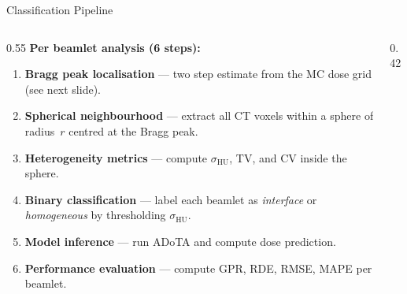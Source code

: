 \documentclass[aspectratio=169, 10pt]{beamer}
\begin{document}
\begin{frame}{Classification Pipeline}
  \begin{columns}[T]
    \begin{column}{0.55\textwidth}
      \textbf{Per beamlet analysis (6 steps):}
      \begin{enumerate}
        \item \textbf{Bragg peak localisation} — two step estimate
              from the MC dose grid (see next slide).
        \item \textbf{Spherical neighbourhood} — extract all CT voxels
              within a sphere of radius~$r$ centred at the Bragg peak.
        \item \textbf{Heterogeneity metrics} — compute $\sigma_{\text{HU}}$,
              TV, and CV inside the sphere.
        \item \textbf{Binary classification} — label each beamlet as
              \emph{interface} or \emph{homogeneous} by thresholding
              $\sigma_{\text{HU}}$.
        \item \textbf{Model inference} — run ADoTA and compute dose
              prediction.
        \item \textbf{Performance evaluation} — compute GPR, RDE, RMSE,
              MAPE per beamlet.
      \end{enumerate}
    \end{column}
    \begin{column}{0.42\textwidth}
      \begin{center}
      \end{center}
    \end{column}
  \end{columns}
\end{frame}
\end{document}
